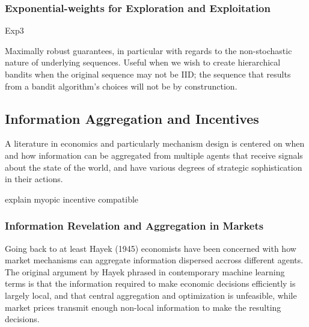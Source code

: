 


\subsubsection{Exponential-weights for Exploration and Exploitation}

Exp3

 Maximally robust guarantees, in particular with regards to the non-stochastic nature of underlying sequences. Useful when we wish to create hierarchical bandits when the original sequence may not be IID; the sequence that results from a bandit algorithm's choices will not be by construnction.





\subsection{Information Aggregation and Incentives}

A literature in economics and particularly mechanism design is centered on when and how information can be aggregated from multiple agents that receive signals about the state of the world, and have various degrees of strategic sophistication in their actions.

explain myopic incentive compatible

\subsubsection{Information Revelation and Aggregation in Markets}



Going back to at least Hayek (1945) economists have been concerned with how market mechanisms can aggregate information dispersed accross different agents.
The original argument by Hayek phrased in contemporary machine learning terms is that the information required to make economic decisions efficiently is largely local, and that central aggregation and optimization is unfeasible, while market prices transmit enough non-local information to make the resulting decisions.



